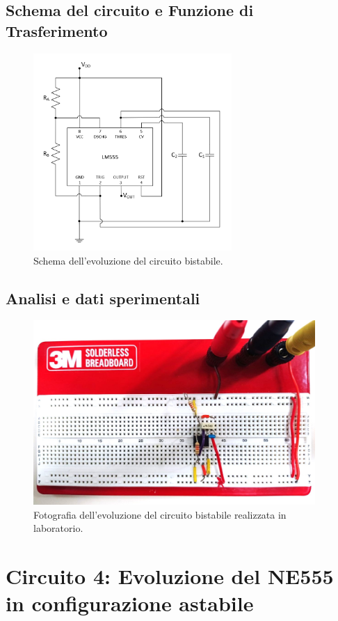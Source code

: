 \documentclass{report}
\begin{document}
\subsection{Schema del circuito e Funzione di Trasferimento}
\begin{figure}[h!]
	\centering
	\includegraphics[height=7.5cm]{immagini/schema3}
	\caption{Schema dell'evoluzione del circuito bistabile.}
	\label{figura:schema3}
\end{figure}
\subsection{Analisi e dati sperimentali}
\begin{figure}[h!]
	\centering
	\includegraphics[height=7cm]{immagini/circuito3}
	\caption{Fotografia dell'evoluzione del circuito bistabile realizzata in laboratorio.}
	\label{figura:circuito3}
\end{figure}
\newpage
\section{Circuito 4: Evoluzione del NE555 in configurazione astabile}
\end{document}
